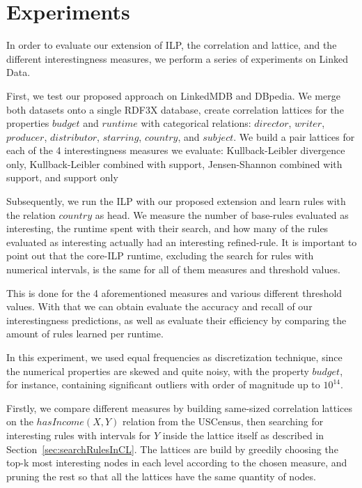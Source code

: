 \chapter{Experiments}
\label{ch:intro}

In order to evaluate our extension of ILP, the correlation and lattice, and the different interestingness measures, we
perform a series of experiments on Linked Data.

First, we test our proposed approach on LinkedMDB and DBpedia. We merge both datasets onto a single RDF3X database,
create correlation lattices for the properties $budget$ and $runtime$ with categorical relations: $director$,
$writer$, $producer$, $distributor$, $starring$, $country$, and $subject$. We build a pair lattices for each of the 4
interestingness measures we evaluate: Kullback-Leibler divergence only, Kullback-Leibler combined with support,
Jensen-Shannon combined with support, and support only

Subsequently, we run the ILP with our proposed extension and learn rules with the relation $country$ as head. We
measure the number of base-rules evaluated as interesting, the runtime spent with their search, and how many of the
rules evaluated as interesting actually had an interesting refined-rule. It is important to point out that the
core-ILP runtime, excluding the search for rules with numerical intervals, is the same for all of them measures and
threshold values. 

This is done for the 4 aforementioned measures and various different threshold values. With that we can obtain evaluate
the accuracy and recall of our interestingness predictions, as well as evaluate their efficiency by comparing the amount
of rules learned per runtime.

In this experiment, we used equal frequencies as discretization technique, since the numerical properties are skewed and
quite noisy, with the property $budget$, for instance, containing significant outliers with order of magnitude up to
$10^{14}$.

Firstly, we compare different measures by building same-sized correlation lattices on the $hasIncome(X,Y)$
relation from the USCensus, then searching for interesting rules with intervals for $Y$ inside the lattice itself as
described in Section~\ref{sec:searchRulesInCL}. The lattices are build by greedily choosing the top-k most interesting
nodes in each level according to the chosen measure, and pruning the rest so that all the lattices have the same
quantity of nodes.

